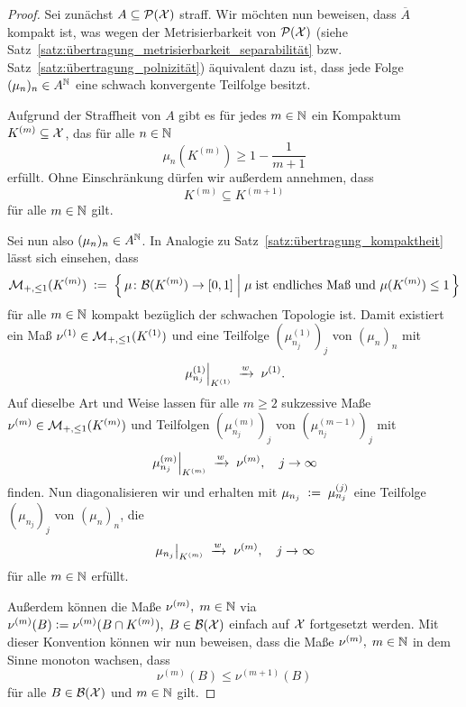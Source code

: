 \documentclass[../main/main.tex]{subfiles}
\begin{document}
	\begin{proof}
		Sei zunächst $A \subseteq \mathcal{P}(\mathcal{X})$ straff. Wir möchten nun beweisen, dass $\overline{A}$ 
		kompakt ist, was wegen der Metrisierbarkeit von $\mathcal{P}(\mathcal{X})$ (siehe Satz~\ref{satz:übertragung_metrisierbarkeit_separabilität} bzw. Satz~\ref{satz:übertragung_polnizität}) äquivalent dazu ist,
		dass jede Folge $(\mu_n)_n \in A^{\mathbb{N}}$ eine schwach konvergente Teilfolge besitzt. 
		
		Aufgrund der Straffheit von $A$ gibt es für jedes $m \in \mathbb{N}$ ein Kompaktum $K^{(m)} \subseteq \mathcal{X}$, 
		das für alle $n \in \mathbb{N}$
		\[ \mu_n(K^{(m)}) \geq 1 - \frac{1}{m+1} \label{glg:5.2} \tag{5.2} \]
		erfüllt. Ohne Einschränkung dürfen wir außerdem annehmen, dass 
		\[ K^{(m)} \subseteq K^{(m+1)} \label{glg:5.3} \tag{5.3} \] 
		für alle $m \in \mathbb{N}$ gilt.
		
		Sei nun also $(\mu_n)_n \in A^{\mathbb{N}}$.
		In Analogie zu Satz~\ref{satz:übertragung_kompaktheit} lässt sich einsehen, dass 
		\[ \mathcal{M}_{+,\leq 1}(K^{(m)}) \; \vcentcolon = \; \left\{\, \mu \colon \mathcal{B}(K^{(m)}) \to [0,1] \; \middle| \; \mu \; 
			\text{ist endliches Maß und } \mu(K^{(m)}) \leq 1 \,\right\} \]
		für alle $m \in \mathbb{N}$ kompakt bezüglich der schwachen Topologie ist. Damit existiert ein Maß 
		$\nu^{(1)} \in \mathcal{M}_{+,\leq 1}(K^{(1)})$ und eine Teilfolge $(\mu_{n_j}^{(1)})_j$ von $(\mu_n)_n$ mit
		\[ \left.\mu_{n_j}^{(1)}\right|_{K^{(1)}} \; \xrightarrow{w} \; \nu^{(1)} \text{.} \]
		Auf dieselbe Art und Weise lassen für alle $m\geq 2$ sukzessive Maße 
		$\nu^{(m)} \in \mathcal{M}_{+,\leq 1}(K^{(m)})$ und Teilfolgen $(\mu_{n_j}^{(m)})_j$ von $(\mu_{n_j}^{(m-1)})_j$ mit
		\[ \left.\mu_{n_j}^{(m)}\right|_{K^{(m)}} \; \xrightarrow{w} \; \nu^{(m)}, \quad j \to \infty \]
		finden.
		Nun diagonalisieren wir und erhalten mit $\mu_{n_j} \; \vcentcolon = \; \mu_{n_j}^{(j)}$ eine Teilfolge 
		$(\mu_{n_j})_j$ von $(\mu_n)_n$, die
		\[ \left.\mu_{n_j}\right|_{K^{(m)}} \; \xrightarrow{w} \; \nu^{(m)}, \quad j \to \infty \]
		für alle $m \in \mathbb{N}$ erfüllt.
		
		Außerdem können die Maße $\nu^{(m)}, \; m \in \mathbb{N}$ via 
		$\nu^{(m)}(B) \vcentcolon = \nu^{(m)}(B \cap K^{(m)}), \; B \in \mathcal{B}(\mathcal{X})$ einfach auf $\mathcal{X}$ fortgesetzt werden. 
		Mit dieser Konvention können wir nun beweisen, dass die Maße
		$\nu^{(m)}, \; m \in \mathbb{N}$ in dem Sinne monoton wachsen, dass 
		\[ \nu^{(m)}(B) \leq \nu^{(m+1)}(B) \label{glg:5.4} \tag{5.4} \]
		für alle $B \in \mathcal{B}(\mathcal{X})$ und $m \in \mathbb{N}$ gilt.
		

\end{proof}
\end{document}
